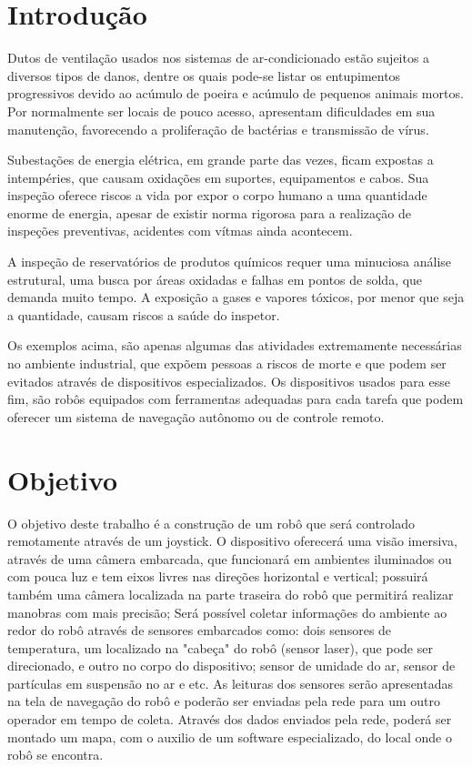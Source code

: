 \documentclass[12pt,a4paper]{article}
\begin{document}
\section{Introdução}
	Dutos de ventilação usados nos sistemas de ar-condicionado estão sujeitos a diversos tipos de danos, dentre os quais pode-se listar os entupimentos progressivos devido ao acúmulo de poeira e acúmulo de pequenos animais mortos. Por normalmente ser locais de pouco acesso, apresentam dificuldades em sua manutenção, favorecendo a proliferação de bactérias e transmissão de vírus\cite{carmo1999qualidade}\cite{bortoletto2002contaminaccao}.\par
	Subestações de energia elétrica, em grande parte das vezes, ficam expostas a intempéries, que causam oxidações em suportes, equipamentos e cabos. Sua inspeção oferece riscos a vida por expor o corpo humano a uma quantidade enorme de energia, apesar de existir norma rigorosa para a realização de inspeções preventivas, acidentes com vítmas ainda acontecem\cite{santos2012inspeccao}.\par
	A inspeção de reservatórios de produtos químicos requer uma minuciosa análise estrutural, uma busca por áreas oxidadas e falhas em pontos de solda, que demanda muito tempo. A exposição a gases e vapores tóxicos, por menor que seja a quantidade, causam riscos a saúde do inspetor\cite{souza2012inspeccao}\cite{molina2008metodo}.\par
	Os exemplos acima, são apenas algumas das atividades extremamente necessárias no ambiente industrial, que expõem pessoas a riscos de morte e que podem ser evitados através de dispositivos especializados. Os dispositivos usados para esse fim, são robôs equipados com ferramentas adequadas para cada tarefa que podem oferecer um sistema de navegação autônomo ou de controle remoto.

\section{Objetivo}
	O objetivo deste trabalho é a construção de um robô que será controlado remotamente através de um joystick. O dispositivo oferecerá uma visão imersiva, através de uma câmera embarcada, que funcionará em ambientes iluminados ou com pouca luz e tem eixos livres nas direções horizontal e vertical; possuirá também uma câmera localizada na parte traseira do robô que permitirá realizar manobras com mais precisão; Será possível coletar informações do ambiente ao redor do robô através de sensores embarcados como: dois sensores de temperatura, um localizado na "cabeça" do robô (sensor laser), que pode ser direcionado, e outro no corpo do dispositivo; sensor de umidade do ar, sensor de partículas em suspensão no ar e etc. As leituras dos sensores serão apresentadas na tela de navegação do robô e poderão ser enviadas pela rede para um outro operador em tempo de coleta. Através dos dados enviados pela rede, poderá ser montado um mapa, com o auxilio de um software especializado, do local onde o robô se encontra.
\end{document}
